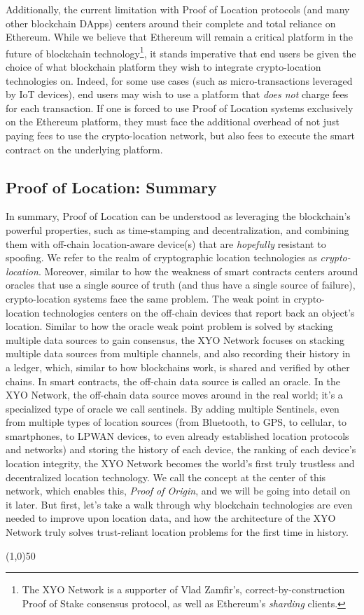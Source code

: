 \documentclass{article}
\begin{document}
Additionally, the current limitation with Proof of Location protocols (and many other blockchain DApps) centers around their complete and total reliance on Ethereum. While we believe that Ethereum will remain a critical platform in the future of blockchain technology\footnote{The XYO Network is a supporter of Vlad Zamfir's, correct-by-construction Proof of Stake consensus protocol, as well as Ethereum's \textit{sharding} clients.}, it stands imperative that end users be given the choice of what blockchain platform they wish to integrate crypto-location technologies on. Indeed, for some use cases (such as micro-transactions leveraged by IoT devices), end users may wish to use a platform that \textit{does not} charge fees for each transaction. If one is forced to use Proof of Location systems exclusively on the Ethereum platform, they must face the additional overhead of not just paying fees to use the crypto-location network, but also fees to execute the smart contract on the underlying platform.

\subsection {Proof of Location: Summary}
In summary, Proof of Location can be understood as leveraging the blockchain's powerful properties, such as time-stamping and decentralization, and combining them with off-chain location-aware device(s) that are \textit{hopefully} resistant to spoofing. We refer to the realm of cryptographic location technologies as \textit{crypto-location}. Moreover, similar to how the weakness of smart contracts centers around oracles that use a single source of truth (and thus have a single source of failure), crypto-location systems face the same problem. The weak point in crypto-location technologies centers on the off-chain devices that report back an object's location. Similar to how the oracle weak point problem is solved by stacking multiple data sources to gain consensus, the XYO Network focuses on stacking multiple data sources from multiple channels, and also recording their history in a ledger, which, similar to how blockchains work, is shared and verified by other chains. In smart contracts, the off-chain data source is called an oracle. In the XYO Network, the off-chain data source moves around in the real world; it's a specialized type of oracle we call \Glspl{sentinel}. By adding multiple Sentinels, even from multiple types of location sources (from Bluetooth, to GPS, to cellular, to smartphones, to LPWAN devices, to even already established location protocols and networks) and storing the history of each device, the ranking of each device's location integrity, the XYO Network becomes the world's first truly trustless and decentralized location technology. We call the concept at the center of this network, which enables this, \textit{Proof of Origin}, and we will be going into detail on it later. But first, let's take a walk through why blockchain technologies are even needed to improve upon location data, and how the architecture of the XYO Network truly solves trust-reliant location problems for the first time in history.
\begin{center}
\line(1,0){50}
\end{center}
\end{document}
